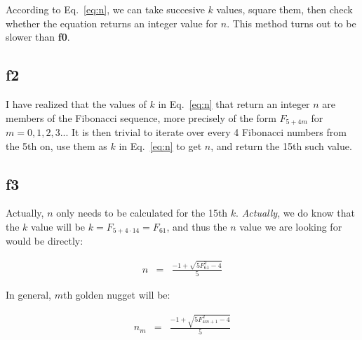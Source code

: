 \documentclass[english]{article}
\begin{document}
According to Eq.~\ref{eq:n}, we can take succesive $k$ values, square them, then check whether the equation returns an integer value for $n$. This method turns out to be slower than {\bf f0}.

\subsection{f2}

I have realized that the values of $k$ in Eq.~\ref{eq:n} that return an integer $n$ are members of the Fibonacci sequence, more precisely of the form $F_{5+4m}$ for $m = 0, 1, 2, 3...$ It is then trivial to iterate over every 4 Fibonacci numbers from the 5th on, use them as $k$ in Eq.~\ref{eq:n} to get $n$, and return the 15th such value. 

\subsection{f3}

Actually, $n$ only needs to be calculated for the 15th $k$. {\it Actually}, we do know that the $k$ value will be $k = F_{5+4\cdot 14} = F_{61}$, and thus the $n$ value we are looking for would be directly:

\begin{eqnarray}
n & = & \frac{-1+\sqrt{5F_{61}^2-4}}{5}
\end{eqnarray}

In general, $m$th golden nugget will be:

\begin{eqnarray}
n_{m} & = & \frac{-1+\sqrt{5F_{4m+1}^2-4}}{5}
\end{eqnarray}
\end{document}

